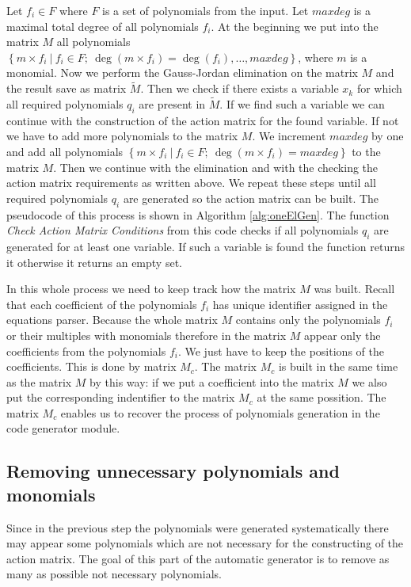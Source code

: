 Let $f_i \in F$ where $F$ is a set of polynomials from the input. Let $maxdeg$ is a maximal total degree of all polynomials $f_i$. At the beginning we put into the matrix $M$ all polynomials $\left\{m\times f_i\ |\ f_i \in F;\ \deg(m\times f_i) = \deg(f_i),\dots, maxdeg\right\}$, where $m$ is a monomial. Now we perform the Gauss-Jordan elimination on the matrix $M$ and the result save as matrix $\tilde{M}$. Then we check if there exists a variable $x_k$ for which all required polynomials $q_i$ are present in $\tilde{M}$. If we find such a variable we can continue with the construction of the action matrix for the found variable. If not we have to add more polynomials to the matrix $M$. We increment $maxdeg$ by one and add all polynomials $\left\{m\times f_i\ |\ f_i \in F;\ \deg(m\times f_i) = maxdeg\right\}$ to the matrix $M$. Then we continue with the elimination and with the checking the action matrix requirements as written above. We repeat these steps until all required polynomials $q_i$ are generated so the action matrix can be built. The pseudocode of this process is shown in Algorithm \ref{alg:oneElGen}. The function \textit{Check Action Matrix Conditions} from this code checks if all polynomials $q_i$ are generated for at least one variable. If such a variable is found the function returns it otherwise it returns an empty set.



In this whole process we need to keep track how the matrix $M$ was built. Recall that each coefficient of the polynomials $f_i$ has unique identifier assigned in the equations parser. Because the whole matrix $M$ contains only the polynomials $f_i$ or their multiples with monomials therefore in the matrix $M$ appear only the coefficients from the polynomials $f_i$. We just have to keep the positions of the coefficients. This is done by matrix $M_c$. The matrix $M_c$ is built in the same time as the matrix $M$ by this way: if we put a coefficient into the matrix $M$ we also put the corresponding indentifier to the matrix $M_c$ at the same possition. The matrix $M_c$ enables us to recover the process of polynomials generation in the code generator module.

\subsection{Removing unnecessary polynomials and monomials}
Since in the previous step the polynomials were generated systematically there may appear some polynomials which are not necessary for the constructing of the action matrix. The goal of this part of the automatic generator is to remove as many as possible not necessary polynomials.

